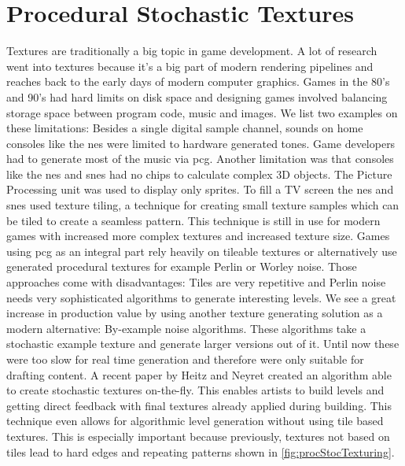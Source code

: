 \documentclass[10pt,a4paper]{article}
\begin{document}
\section{Procedural Stochastic Textures}
\begin{multicols}{2}
Textures are traditionally a big topic in game development. A lot of research went into textures because it’s a big part of modern rendering pipelines and reaches back to the early days of modern computer graphics. Games in the 80’s and 90’s had hard limits on disk space\cite{Ferrari2016} and designing games involved balancing storage space between program code, music and images. We list two examples on these limitations: Besides a single digital sample channel, sounds on home consoles like the \gls{nes} were limited to hardware generated tones\cite{wiki:NintendoEntertainmentSystem}. Game developers had to generate most of the music via \gls{pcg}. Another limitation was that consoles like the \gls{nes} and \gls{snes} had no chips to calculate complex 3D objects. The Picture Processing unit was used to display only sprites. To fill a TV screen the \gls{nes} and \gls{snes} used texture tiling, a technique for creating small texture samples which can be tiled to create a seamless pattern. This technique is still in use for modern games with increased more complex textures and increased texture size. Games using \gls{pcg} as an integral part rely heavily on tileable textures or alternatively use generated procedural textures for example Perlin\cite{perlin1985image} or Worley\cite{worley1996cellular} noise. Those approaches come with disadvantages: Tiles are very repetitive and Perlin noise needs very sophisticated algorithms to generate interesting levels. We see a great increase in production value by using another texture generating solution as a modern alternative: By-example noise algorithms. These algorithms take a stochastic example texture and generate larger versions out of it. Until now these were too slow for real time generation and therefore were only suitable for drafting content. A recent paper by Heitz and Neyret created an algorithm able to create stochastic textures on-the-fly\cite{Heitz2018}. This enables artists to build levels and getting direct feedback with final textures already applied during building. This technique even allows for algorithmic level generation without using tile based textures. This is especially important because previously, textures not based on tiles lead to hard edges and repeating patterns shown in \autoref{fig:procStocTexturing}.
\end{multicols}
\end{document}
